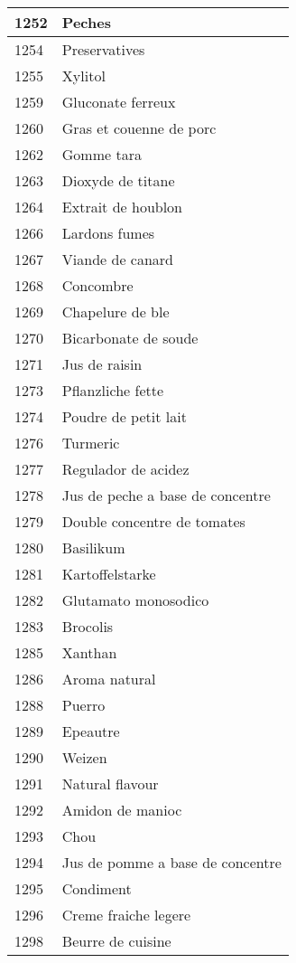 \begin{longtable}{|l|l|}
1252 & Peches \\ \hline 
1254 & Preservatives \\ \hline 
1255 & Xylitol \\ \hline 
1259 & Gluconate ferreux \\ \hline 
1260 & Gras et couenne de porc \\ \hline 
1262 & Gomme tara \\ \hline 
1263 & Dioxyde de titane \\ \hline 
1264 & Extrait de houblon \\ \hline 
1266 & Lardons fumes \\ \hline 
1267 & Viande de canard \\ \hline 
1268 & Concombre \\ \hline 
1269 & Chapelure de ble \\ \hline 
1270 & Bicarbonate de soude \\ \hline 
1271 & Jus de raisin \\ \hline 
1273 & Pflanzliche fette \\ \hline 
1274 & Poudre de petit lait \\ \hline 
1276 & Turmeric \\ \hline 
1277 & Regulador de acidez \\ \hline 
1278 & Jus de peche a base de concentre \\ \hline 
1279 & Double concentre de tomates \\ \hline 
1280 & Basilikum \\ \hline 
1281 & Kartoffelstarke \\ \hline 
1282 & Glutamato monosodico \\ \hline 
1283 & Brocolis \\ \hline 
1285 & Xanthan \\ \hline 
1286 & Aroma natural \\ \hline 
1288 & Puerro \\ \hline 
1289 & Epeautre \\ \hline 
1290 & Weizen \\ \hline 
1291 & Natural flavour \\ \hline 
1292 & Amidon de manioc \\ \hline 
1293 & Chou \\ \hline 
1294 & Jus de pomme a base de concentre \\ \hline 
1295 & Condiment \\ \hline 
1296 & Creme fraiche legere \\ \hline 
1298 & Beurre de cuisine \\ \hline 

\end{longtable}
